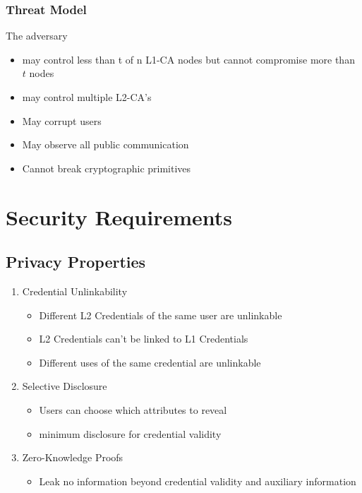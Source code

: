 \subsubsection{Threat Model}
The adversary 
\begin{itemize}
    \item may control less than t of n L1-CA nodes but cannot compromise more than $t$ nodes
    \item may control multiple L2-CA's
    \item May corrupt users
    \item May observe all public communication
    \item Cannot break cryptographic primitives
\end{itemize}

\section{Security Requirements}

\subsection{Privacy Properties}
\begin{enumerate}
    \item Credential Unlinkability
    \begin{itemize}
        \item Different L2 Credentials of the same user are unlinkable
        \item L2 Credentials can't be linked to L1 Credentials
        \item Different uses of the same credential are unlinkable
    \end{itemize}

    \item Selective Disclosure
    \begin{itemize}
        \item Users can choose which attributes to reveal
        \item minimum disclosure for credential validity
    \end{itemize}

    \item Zero-Knowledge Proofs
    \begin{itemize}
        \item Leak no information beyond credential validity and auxiliary information 
    \end{itemize}
\end{enumerate}

